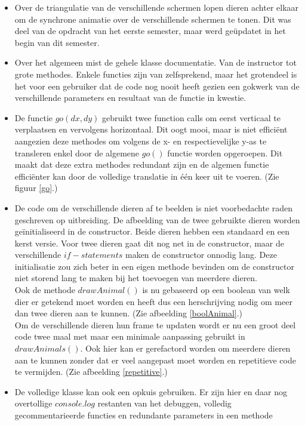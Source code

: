 \documentclass[a4paper,11pt]{article}
\begin{document}
    \begin{itemize}
        \item Over de triangulatie van de verschillende schermen lopen dieren achter elkaar om de synchrone animatie over de verschillende schermen te tonen. Dit was deel van de opdracht van het eerste semester, maar werd geüpdatet in het begin van dit semester.

        \item Over het algemeen mist de gehele klasse documentatie. Van de instructor tot grote methodes. Enkele functies zijn van zelfsprekend, maar het grotendeel is het voor een gebruiker dat de code nog nooit heeft gezien een gokwerk van de verschillende parameters en resultaat van de functie in kwestie.

        \item De functie $go(dx, dy)$ gebruikt twee function calls om eerst verticaal te verplaatsen en vervolgens horizontaal. Dit oogt mooi, maar is niet efficiënt aangezien deze methodes om volgens de x- en respectievelijke y-as te transleren enkel door de algemene $go()$ functie worden opgeroepen. Dit maakt dat deze extra methodes redundant zijn en de algemen functie efficiënter kan door de volledige translatie in één keer uit te voeren. (Zie figuur \ref{go}.)

        \item De code om de verschillende dieren af te beelden is niet voorbedachte raden geschreven op uitbreiding. De afbeelding van de twee gebruikte dieren worden geïnitialiseerd in de constructor. Beide dieren hebben een standaard en een kerst versie. Voor twee dieren gaat dit nog net in de constructor, maar de verschillende $if-statements$ maken de constructor onnodig lang. Deze initialisatie zou zich beter in een eigen methode bevinden om de constructor niet storend lang te maken bij het toevoegen van meerdere dieren.\\
        Ook de methode $drawAnimal()$ is nu gebaseerd op een boolean van welk dier er getekend moet worden en heeft dus een herschrijving nodig om meer dan twee dieren aan te kunnen. (Zie afbeelding \ref{boolAnimal}.)\\
        Om de verschillende dieren hun frame te updaten wordt er nu een groot deel code twee maal met maar een minimale aanpassing gebruikt in $drawAnimals()$. Ook hier kan er gerefactord worden om meerdere dieren aan te kunnen zonder dat er veel aangepast moet worden en repetitieve code te vermijden. (Zie afbeelding \ref{repetitive}.)

        \item De volledige klasse kan ook een opkuis gebruiken. Er zijn hier en daar nog overtollige $console.log$ restanten van het debuggen, volledig gecommentarieerde functies en redundante parameters in een methode
    \end{itemize}
\end{document}
